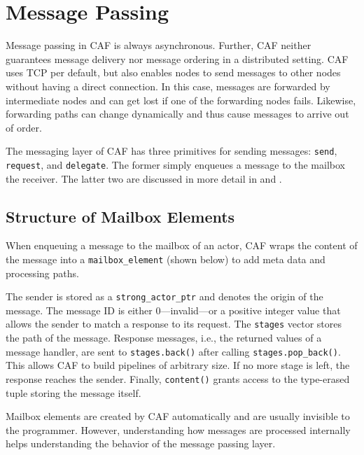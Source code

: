 \section{Message Passing}
\label{message-passing}

Message passing in CAF is always asynchronous. Further, CAF neither guarantees
message delivery nor message ordering in a distributed setting. CAF uses TCP
per default, but also enables nodes to send messages to other nodes without
having a direct connection.  In this case, messages are forwarded by
intermediate nodes and can get lost if one of the forwarding nodes fails.
Likewise, forwarding paths can change dynamically and thus cause messages to
arrive out of order.

The messaging layer of CAF has three primitives for sending messages:
\lstinline^send^, \lstinline^request^, and \lstinline^delegate^. The former
simply enqueues a message to the mailbox the receiver. The latter two are
discussed in more detail in  and .

\subsection{Structure of Mailbox Elements}
\label{mailbox-element}

When enqueuing a message to the mailbox of an actor, CAF wraps the content of
the message into a \lstinline^mailbox_element^ (shown below) to add meta data
and processing paths.


The sender is stored as a \lstinline^strong_actor_ptr^  and
denotes the origin of the message. The message ID is either 0---invalid---or a
positive integer value that allows the sender to match a response to its
request. The \lstinline^stages^ vector stores the path of the message. Response
messages, i.e., the returned values of a message handler, are sent to
\lstinline^stages.back()^ after calling \lstinline^stages.pop_back()^. This
allows CAF to build pipelines of arbitrary size. If no more stage is left, the
response reaches the sender. Finally, \lstinline^content()^ grants access to
the type-erased tuple storing the message itself.

Mailbox elements are created by CAF automatically and are usually invisible to
the programmer. However, understanding how messages are processed internally
helps understanding the behavior of the message passing layer.

